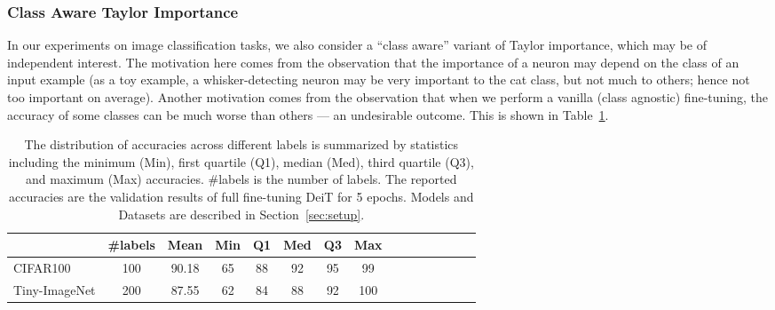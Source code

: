 \subsubsection{Class Aware Taylor Importance} \label{subsubsec:QMTaylor}
In our experiments on image classification tasks, we also consider a ``class aware'' variant of Taylor importance, which may be of independent interest. The motivation here comes from the observation that the importance of a neuron may depend on the class of an input example (as a toy example, a whisker-detecting neuron may be very important to the cat class, but not much to others; hence not too important on average). Another motivation comes from the observation that when we perform a vanilla (class agnostic) fine-tuning, the accuracy of some classes can be much worse than others --- an undesirable outcome. This is shown in Table~\ref{tab:labelwise_acc}. 

\begin{table}[htbp]
\tiny
\begin{center}
\begin{tabular}{l|c|c|cccccccccccl}\toprule
& \#labels & Mean & Min & Q1 & Med & Q3 & Max \\\midrule
CIFAR100 & 100 & 90.18 & 65 & 88 & 92 & 95 & 99 \\\midrule
Tiny-ImageNet & 200 & 87.55 & 62 & 84 & 88 & 92 & 100\\\bottomrule

\end{tabular}
\caption{The distribution of accuracies across different labels is summarized by statistics including the minimum (Min), first quartile (Q1), median (Med), third quartile (Q3), and maximum (Max) accuracies. \#labels is the number of labels. The reported accuracies are the validation results of full fine-tuning DeiT for 5 epochs. Models and Datasets are described in Section~\ref{sec:setup}.} \label{tab:labelwise_acc} 
\end{center}
\end{table}


